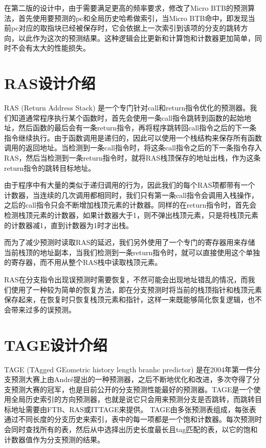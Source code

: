 在第二版的设计中，由于需要满足更高的频率要求，修改了Micro BTB的预测算法，首先使用要预测的pc和全局历史哈希做索引，当Micro BTB命中，即发现当前pc对应的取指块已经被保存时，它会依据上一次索引到该项的分支的跳转方向，以此作为这次的预测结果。这种逻辑会比更新和计算饱和计数器更加简单，同时不会有太大的性能损失。

\section{RAS设计介绍}

RAS (Return Address Stack) 是一个专门针对call和return指令优化的预测器。我们知道通常程序执行某个函数时，首先会使用一条call指令跳转到函数的起始地址，然后函数的最后会有一条return指令，再将程序跳转回call指令之后的下一条指令继续执行。由于函数调用是递归的，因此可以使用一个栈结构来保存所有函数调用的返回地址。当检测到一条call指令时，将这条call指令之后的下一条指令存入RAS，然后当检测到一条return指令时，就将RAS栈顶保存的地址出栈，作为这条return指令的跳转目标地址。

由于程序中有大量的类似于递归调用的行为，因此我们的每个RAS项都带有一个计数器，当连续的几次调用都相同时，我们只有第一条call指令会调用入栈操作，之后的call指令只会不断增加栈顶元素的计数器。同样的在return指令时，首先会检测栈顶元素的计数器，如果计数器大于1，则不弹出栈顶元素，只是将栈顶元素的计数器减1，直到计数器为1时才出栈。

而为了减少预测时读取RAS的延迟，我们另外使用了一个专门的寄存器用来存储当前栈顶的地址副本，当我们检测到一条return指令时，就可以直接使用这个单独的寄存器，而不用从整个RAS栈中读取栈顶元素。

RAS在分支指令出现误预测时需要恢复，不然可能会出现地址错乱的情况，而我们使用了一种较为简单的恢复方法，即在分支预测时将当前的栈顶指针和栈顶元素保存起来，在恢复时只恢复栈顶元素和指针，这样一来既能够简化恢复逻辑，也不会带来过多的误预测。

\section{TAGE设计介绍}

TAGE (TAgged GEometric history length branhc predictor) 是在2004年第一件分支预测大赛上由André提出的一种预测器，之后不断地优化和改进，多次夺得了分支预测大赛的冠军，也是目前公开的分支预测性能最好的预测器。TAGE是一个使用全局历史索引的方向预测器，也就是说它只会用来预测分支是否跳转，而跳转目标地址需要由FTB、RAS或ITTAGE来提供。
TAGE由多张预测表组成，每张表通过不同长度的分支历史来索引，表中的每一项都是一个饱和计数器。每次预测时会同时查找所有的表，然后从中选择出历史长度最长且tag匹配的表，以它的饱和计数器值作为分支预测的结果。

